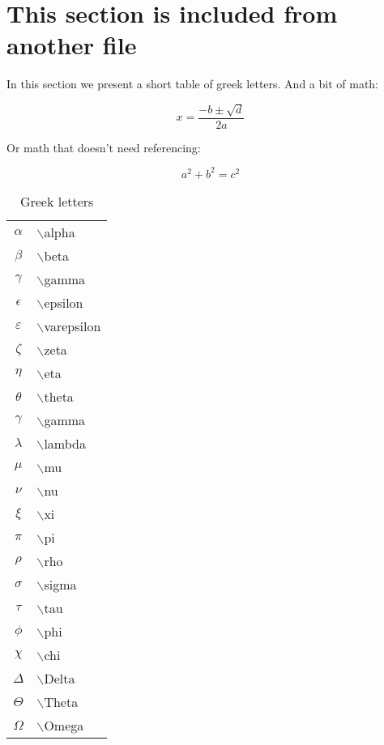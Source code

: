 \section{This section is included from another file}
\label{sec:included-section}

In this section we present a short table of greek letters. And a bit
of math:

\begin{equation}
  \label{eq:roots}
  x = \frac{-b \pm \sqrt{d}}{2a}
\end{equation}

Or math that doesn't need referencing:

$$
a^2 + b^2 = c^2
$$

\begin{table}[h]
  \centering
  \begin{tabular}{c l}
    $\alpha$ & $\backslash$alpha\\
    $\beta$ & $\backslash$beta\\
    $\gamma$ & $\backslash$gamma\\
    $\epsilon$ & $\backslash$epsilon\\
    $\varepsilon$ & $\backslash$varepsilon\\
    $\zeta$ & $\backslash$zeta\\
    $\eta$ & $\backslash$eta\\
    $\theta$ & $\backslash$theta\\
    $\gamma$ & $\backslash$gamma\\
    $\lambda$ & $\backslash$lambda\\
    $\mu$ & $\backslash$mu\\
    $\nu$ & $\backslash$nu\\
    $\xi$ & $\backslash$xi\\
    $\pi$ & $\backslash$pi\\
    $\rho$ & $\backslash$rho\\
    $\sigma$ & $\backslash$sigma\\
    $\tau$ & $\backslash$tau\\
    $\phi$ & $\backslash$phi\\
    $\chi$ & $\backslash$chi\\
    $\Delta$ & $\backslash$Delta\\
    $\Theta$ & $\backslash$Theta\\
    $\Omega$ & $\backslash$Omega
  \end{tabular}
  \caption{Greek letters}
  \label{tab:greek-letters}
\end{table}

